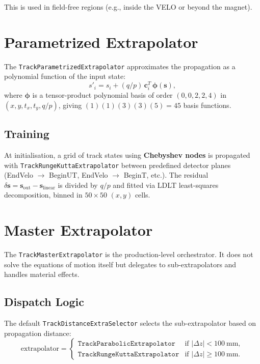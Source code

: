 \documentclass[11pt,a4paper]{article}
\newcommand{\dz}{\Delta z}
\newcommand{\qop}{q/p}
\newcommand{\bvec}[1]{\mathbf{#1}}
\newcommand{\vstate}{\bvec{s}}
\begin{document}
This is used in field-free regions (e.g., inside the VELO or beyond the magnet).


\section{Parametrized Extrapolator}\label{sec:parametrized}

The \texttt{TrackParametrizedExtrapolator} approximates the propagation as a
polynomial function of the input state:
\begin{equation}
  s'_i = s_i + (\qop)\,\bvec{c}_i^T\,\bvec{\phi}(\vstate),
\end{equation}
where $\bvec{\phi}$ is a tensor-product polynomial basis of order
$(0,0,2,2,4)$ in $(x,y,t_x,t_y,\qop)$, giving
$(1)(1)(3)(3)(5) = 45$ basis functions.

\subsection{Training}

At initialisation, a grid of track states using \textbf{Chebyshev nodes} is
propagated with \texttt{TrackRungeKutta\-Extrapolator} between predefined
detector planes (EndVelo $\to$ BeginUT, EndVelo $\to$ BeginT, etc.).
The residual
$\delta \bvec{s} = \bvec{s}_\text{out} - \bvec{s}_\text{linear}$
is divided by $\qop$ and fitted via LDLT least-squares decomposition, binned
in $50{\times}50$ $(x,y)$ cells.


\section{Master Extrapolator}\label{sec:master}

The \texttt{TrackMasterExtrapolator} is the production-level orchestrator. It
does not solve the equations of motion itself but delegates to sub-extrapolators
and handles material effects.

\subsection{Dispatch Logic}

The default \texttt{TrackDistanceExtraSelector} selects the sub-extrapolator
based on propagation distance:
\begin{equation}
  \text{extrapolator} = \begin{cases}
    \texttt{TrackParabolicExtrapolator} & \text{if } |\dz| < 100~\text{mm}, \\[3pt]
    \texttt{TrackRungeKuttaExtrapolator} & \text{if } |\dz| \geq 100~\text{mm}.
  \end{cases}
\end{equation}
\end{document}
